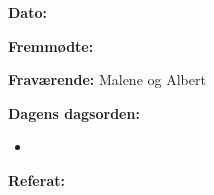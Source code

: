 \textbf{Dato:} 

\textbf{Fremmødte:} 

\textbf{Fraværende:} Malene og Albert

\textbf{Dagens dagsorden:}
\begin{itemize}
	\item 
\end{itemize}

\textbf{Referat:}